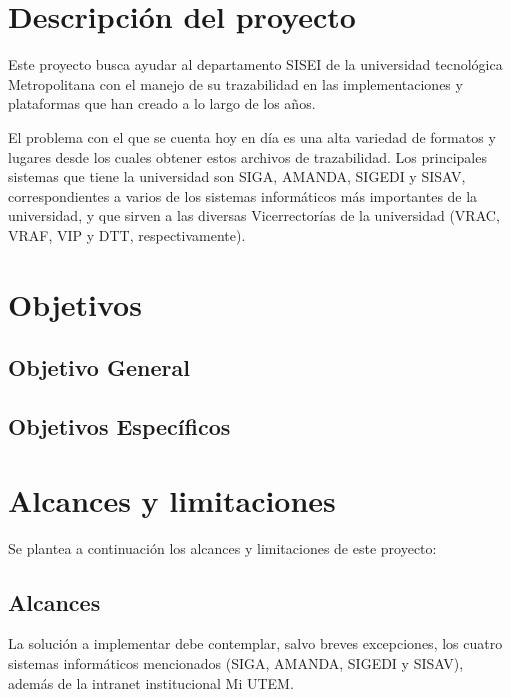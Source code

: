 \section{Descripción del proyecto}

Este proyecto busca ayudar al departamento SISEI de la universidad tecnológica Metropolitana con el manejo de su trazabilidad en las implementaciones y plataformas que han creado a lo largo de los años.

El problema con el que se cuenta hoy en día es una alta variedad de formatos y lugares desde los cuales obtener estos archivos de trazabilidad. Los principales sistemas que tiene la universidad son SIGA, AMANDA, SIGEDI y SISAV, correspondientes a varios de los sistemas informáticos más importantes de la universidad, y que sirven a las diversas Vicerrectorías de la universidad (VRAC, VRAF, VIP y DTT, respectivamente).

\lipsum[2]

\section{Objetivos}
\subsection{Objetivo General}


\subsection{Objetivos Específicos}


\section{Alcances y limitaciones}

Se plantea a continuación los alcances y limitaciones de este proyecto:

\subsection{Alcances}

La solución a implementar debe contemplar, salvo breves excepciones, los cuatro sistemas informáticos mencionados (SIGA, AMANDA, SIGEDI y SISAV), además de la intranet institucional Mi UTEM.

